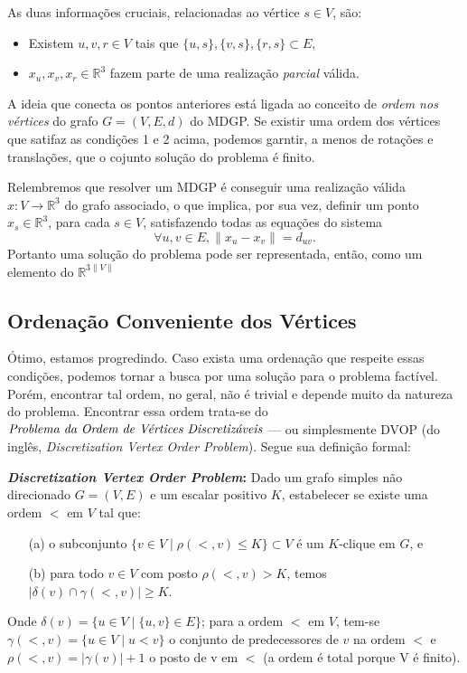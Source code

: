 \documentclass[a4paper,12pt]{article}
\begin{document}
	As duas informações cruciais, relacionadas ao vértice $s\in V$, são:
	\begin{itemize}
		\item Existem $u, v, r \in V$ tais que $\{u, s\}, \{v, s\}, \{r, s\}\subset E$,
		\item $x_{u}, x_{v}, x_{r} \in\mathbb{R}^{3}$ fazem parte de uma realização \textit{parcial} válida. 
	\end{itemize}
	
	A ideia que conecta os pontos anteriores está ligada ao conceito de \textit{ordem nos vértices} do grafo $G = (V, E, d)$ do MDGP. Se existir uma ordem dos vértices que satifaz as condições 1 e 2 acima, podemos garntir, a menos de rotações e translações, que o cojunto solução do problema é finito.
	
	Relembremos que resolver um MDGP é conseguir uma realização válida $x: V \rightarrow\mathbb{R}^{3}$ do grafo associado, o que implica, por sua vez, definir um ponto $x_{s}\in\mathbb{R}^3$, para cada $s\in V$, satisfazendo todas as equações do sistema
	$$
	\forall {u, v}\in E, \|x_{u} - x_{v}\| = d_{uv}.
	$$
	Portanto uma solução do problema pode ser representada, então, como um elemento do $\mathbb{R}^{3\|V\|}$
	
	\subsection{Ordenação Conveniente dos Vértices \label{sec:hc}}
	Ótimo, estamos progredindo. Caso exista uma ordenação que respeite essas condições, podemos tornar a busca por uma solução para o problema factível. Porém, encontrar tal ordem, no geral, não é trivial e depende muito da natureza do problema. Encontrar essa ordem trata-se do $\emph{Problema da Ordem de Vértices Discretizáveis}$ --- ou simplesmente DVOP (do inglês, \textit{Discretization Vertex Order Problem}). Segue sua definição formal:
	
	\begin{center}
		\begin{minipage}{0.9 \linewidth}
			\textbf{\textit{Discretization Vertex Order Problem}:} Dado um grafo simples não direcionado $G = (V, E)$ e um escalar positivo $K$, estabelecer se existe uma ordem $<$ em $V$ tal que: 
			\begin{enumerate}
				\item[(a)] o subconjunto $\{v \in V \mid \rho(<,v) \leq K\} \subset V$ é um $K$-clique em $G$, e
				\item[(b)] para todo $v \in V$ com posto $\rho(<,v) > K$, temos $|\delta(v) \cap \gamma(<,v)| \geq K$.
			\end{enumerate}
			Onde $\delta(v) = \{u \in V \mid  \{u,v\} \in E\}$; para a ordem $<$ em $V$, tem-se $\gamma(<,v) = \{u \in V \mid u < v\}$ o conjunto de predecessores de $v$ na ordem $<$ e $\rho(<,v) = |\gamma(v)| + 1$ o posto de v em $<$ (a ordem é total porque V é finito).
		\end{minipage}
	\end{center}
\end{document}
